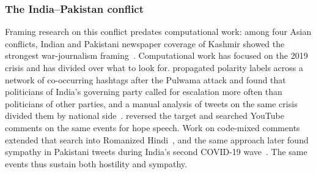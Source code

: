 \subsubsection{The India--Pakistan conflict}
Framing research on this conflict predates computational work: among four Asian conflicts, Indian and Pakistani newspaper coverage of Kashmir showed the strongest war-journalism framing~\cite{lee2005war}. Computational work has focused on the 2019 crisis and has divided over what to look for. \citet{tyagi2020ipconflict} propagated polarity labels across a network of co-occurring hashtags after the Pulwama attack and found that politicians of India's governing party called for escalation more often than politicians of other parties, and a manual analysis of tweets on the same crisis divided them by national side~\cite{hussain2021pulwama}. \citet{palakodety2020hope} reversed the target and searched YouTube comments on the same events for hope speech. Work on code-mixed comments extended that search into Romanized Hindi~\cite{khudabukhsh2020codeswitch}, and the same approach later found sympathy in Pakistani tweets during India's second COVID-19 wave~\cite{yoo2021empathy}. The same events thus sustain both hostility and sympathy.



